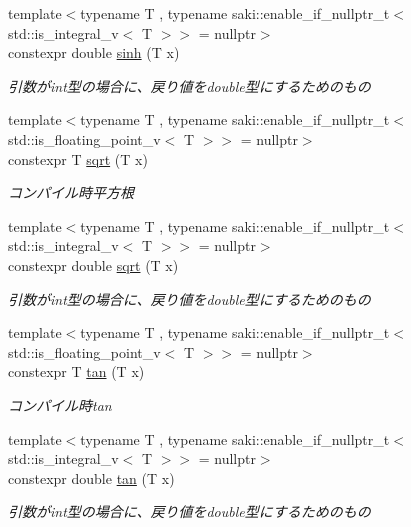 \begin{DoxyCompactItemize}
{\footnotesize template$<$typename T , typename saki\+::enable\+\_\+if\+\_\+nullptr\+\_\+t$<$ std\+::is\+\_\+integral\+\_\+v$<$ T $>$$>$  = nullptr$>$ }\\constexpr double \mbox{\hyperlink{namespacesaki_a8199390b7650fdebe491aaeb4c3a44c3}{sinh}} (T x)
\begin{DoxyCompactList}\small\item\em 引数がint型の場合に、戻り値をdouble型にするためのもの \end{DoxyCompactList}\item 
{\footnotesize template$<$typename T , typename saki\+::enable\+\_\+if\+\_\+nullptr\+\_\+t$<$ std\+::is\+\_\+floating\+\_\+point\+\_\+v$<$ T $>$$>$  = nullptr$>$ }\\constexpr T \mbox{\hyperlink{namespacesaki_a5c2f6c98a144d6ba6683c86c865fd595}{sqrt}} (T x)
\begin{DoxyCompactList}\small\item\em コンパイル時平方根 \end{DoxyCompactList}\item 
{\footnotesize template$<$typename T , typename saki\+::enable\+\_\+if\+\_\+nullptr\+\_\+t$<$ std\+::is\+\_\+integral\+\_\+v$<$ T $>$$>$  = nullptr$>$ }\\constexpr double \mbox{\hyperlink{namespacesaki_a66fac13294984ad19b8b7fec3b5466b5}{sqrt}} (T x)
\begin{DoxyCompactList}\small\item\em 引数がint型の場合に、戻り値をdouble型にするためのもの \end{DoxyCompactList}\item 
{\footnotesize template$<$typename T , typename saki\+::enable\+\_\+if\+\_\+nullptr\+\_\+t$<$ std\+::is\+\_\+floating\+\_\+point\+\_\+v$<$ T $>$$>$  = nullptr$>$ }\\constexpr T \mbox{\hyperlink{namespacesaki_a491321db8475898649b625dca5401726}{tan}} (T x)
\begin{DoxyCompactList}\small\item\em コンパイル時tan \end{DoxyCompactList}\item 
{\footnotesize template$<$typename T , typename saki\+::enable\+\_\+if\+\_\+nullptr\+\_\+t$<$ std\+::is\+\_\+integral\+\_\+v$<$ T $>$$>$  = nullptr$>$ }\\constexpr double \mbox{\hyperlink{namespacesaki_a52704083849bbdf4ab635cca985c00ae}{tan}} (T x)
\begin{DoxyCompactList}\small\item\em 引数がint型の場合に、戻り値をdouble型にするためのもの \end{DoxyCompactList}\item 

\end{DoxyCompactItemize}
